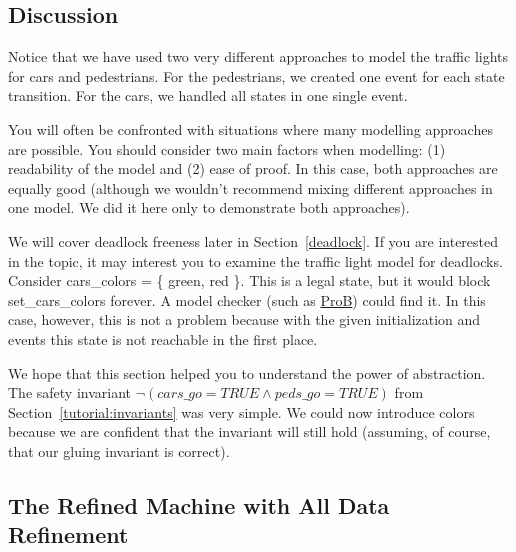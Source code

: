 
\subsection{Discussion}
\label{tut_concepts_discussion}

Notice that we have used two very different approaches to model the traffic lights for cars and pedestrians.  For the pedestrians, we created one event for each state transition.  For the cars, we handled all states in one single event.

You will often be confronted with situations where many modelling approaches are possible.  You should consider two main factors when modelling: (1) readability of the model and (2) ease of proof.  In this case, both approaches are equally good (although we wouldn't recommend mixing different approaches in one model. We did it here only to demonstrate both approaches).

We will cover deadlock freeness later in Section~\ref{deadlock}.  If you are interested in the topic, it may interest you to examine the traffic light model for deadlocks.  Consider \textsf{cars\_colors = \{ green, red \}}. This is a legal state, but it would block \textsf{set\_cars\_colors} forever.  A model checker (such as \href{http://www.stups.uni-duesseldorf.de/ProB}{ProB}) could find it.  In this case, however, this is not a problem because with the given initialization and events this state is not reachable in the first place.

We hope that this section helped you to understand the power of abstraction.  The safety invariant
$\lnot(cars\_go = TRUE \land peds\_go = TRUE)$ from Section~\ref{tutorial:invariants} was very simple.  We could now introduce colors because we are confident that the invariant will still hold (assuming, of course, that our gluing invariant is correct).

\subsection{The Refined Machine with All Data Refinement}

